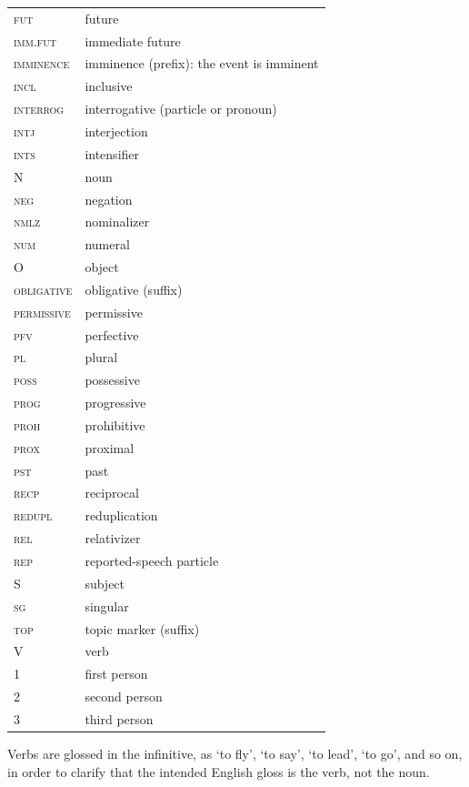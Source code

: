\begin{table}[H]
\begin{tabularx}{\textwidth}{ @{}l Q }
	\textsc{fut} & future\\
	\textsc{imm.fut} & immediate future\\
	\textsc{imminence} & imminence (prefix): the event is imminent\\
	\textsc{incl} & inclusive\\
	\textsc{interrog} & interrogative (particle or pronoun)\\
	\textsc{intj} & interjection\\
	\textsc{ints} & intensifier\\
	\textsc{N} & noun\\
	\textsc{neg} & negation\\
	\textsc{nmlz} & nominalizer\\
	\textsc{num} & numeral\\
	\textsc{O} & object\\
	\textsc{obligative} & obligative (suffix)\\
	\textsc{permissive} & permissive\\
	\textsc{pfv} & perfective\\
	\textsc{pl} & plural\\
	\textsc{poss} & possessive\\
	\textsc{prog} & progressive\\
	\textsc{proh} & prohibitive\\
	\textsc{prox} & proximal\\
	\textsc{pst} & past\\
	\textsc{recp} & reciprocal\\
	\textsc{redupl} & reduplication\\
	\textsc{rel} & relativizer\\
	\textsc{rep} & reported-speech particle\\
	\textsc{S} & subject\\
	\textsc{sg} & singular\\
	\textsc{top} & topic marker (suffix)\\
	\textsc{V} & verb\\
	1 & first person\\
	2 & second person\\
	3 & third person\\
\end{tabularx}
\end{table}

Verbs are glossed in the infinitive, as ‘to fly’, ‘to say’, ‘to lead’, ‘to go’, and so on, in order to clarify that the intended English gloss is the verb, not the noun. 

